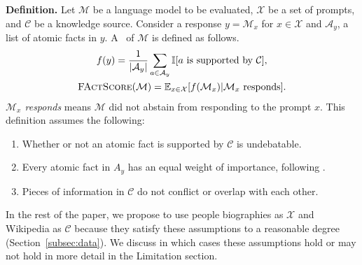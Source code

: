 \vspace{.3em}
\noindent
\textbf{Definition.}
Let $\mathcal{M}$ be a language model to be evaluated,
$\mathcal{X}$ be a set of prompts,
and $\mathcal{C}$ be a knowledge source.
Consider a response $y = \mathcal{M}_x$ for $x \in \mathcal{X}$
and $\mathcal{A}_y$, a list of atomic facts in $y$.
A \ours\ of $\mathcal{M}$ is defined as follows.
\begin{align*}
    \begin{gathered}
        f(y) = \frac{1}{|\mathcal{A}_y|}\sum_{a \in \mathcal{A}_y}\mathbb{I}[a \text{~is supported by~} \mathcal{C}], \\
        \text{\textsc{FActScore}}(\mathcal{M}) =
        \mathbb{E}_{x \in \mathcal{X}}[f(\mathcal{M}_x) | \mathcal{M}_x\text{~responds}].
    \end{gathered}
\end{align*} {\em $\mathcal{M}_x$ responds} means $\mathcal{M}$ did not abstain from responding to the prompt $x$.
This definition assumes the following:
\vspace{-.3em}
\begin{enumerate}[leftmargin=15pt]\itemsep -.2em
    \item Whether or not an atomic fact is supported by $\mathcal{C}$ is undebatable.
    \item Every atomic fact in $A_y$ has an equal weight of importance, following \citet{krishna-etal-2023-longeval}. 
    \item Pieces of information in $\mathcal{C}$ do not conflict or overlap with each other.
\end{enumerate}
In the rest of the paper, we propose to use people biographies as $\mathcal{X}$ and Wikipedia as $\mathcal{C}$ because they satisfy these assumptions to a reasonable degree (Section~\ref{subsec:data}).
We discuss in which cases these assumptions hold or may not hold in more detail in the Limitation section. %

